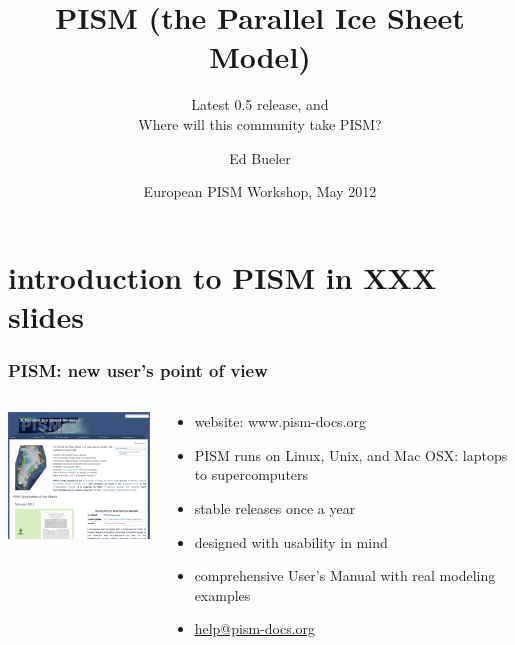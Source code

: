 \documentclass[hide notes,intlimits]{beamer}
\title[PISM (the Parallel Ice Sheet Model)] %
{PISM (the Parallel Ice Sheet Model)}
\subtitle{Latest 0.5 release, and \\ Where will this community take PISM?}
\author[Bueler] %
{Ed Bueler}
\institute{
University of Alaska Fairbanks
}
\date{European PISM Workshop, May 2012}
\begin{document}


{
} 

\begin{frame}
  \titlepage
\end{frame}

{
}

\section[introduction]{introduction to PISM in XXX slides}

\begin{frame}
  \frametitle{PISM: new user's point of view}
  \begin{columns}
    \begin{column}{50mm}
      \includegraphics[width=50mm]{pismdocs.png}
    \end{column}
    \begin{column}{70mm}
      \begin{itemize}
      \item website: \alert{www.pism-docs.org}
      \item PISM runs on Linux, Unix, and Mac OSX: laptops to supercomputers
      \item stable releases once a year
      \item designed with usability in mind
      \item comprehensive User's Manual with real modeling examples
      \item \url{help@pism-docs.org}
      \end{itemize}
    \end{column}
  \end{columns}
\end{frame}
\end{document}
